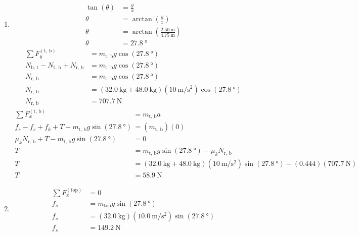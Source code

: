 \documentclass{article}
\begin{document}
\begin{enumerate}[label=\textbf{(\alph*)}]
	\item
		\begin{align*}
			\tan(\theta) & = \frac{y}{x} \\
			\theta & = \arctan \left( \frac{y}{x} \right) \\
			\theta & = \arctan \left( \frac{\SI{2.50}{\meter}}{\SI{4.75}{\meter}} \right) \\
			\theta & = \SI{27.8}{\degree}
		\end{align*}
		\begin{align*}
			\sum F_y^{(\text{t, b})} & = m_\text{t, b}g\cos(\SI{27.8}{\degree}) \\
			N_\text{b, t} - N_\text{t, b} + N_\text{r, b} & = m_\text{t, b}g\cos(\SI{27.8}{\degree}) \\
			N_\text{r, b} & = m_\text{t, b}g\cos(\SI{27.8}{\degree}) \\
			N_\text{r, b} & = (\SI{32.0}{\kilogram} + \SI{48.0}{\kilogram})(\SI{10}{\meter \per \second \squared})\cos(\SI{27.8}{\degree}) \\
			N_\text{r, b} & = \SI{707.7}{\newton}
		\end{align*}
		\begin{align*}
			\sum F_x^{(\text{t, b})} & = m_\text{t, b}a \\
			f_s - f_s + f_k + T - m_\text{t, b}g\sin(\SI{27.8}{\degree}) & = (m_\text{t, b})(0) \\
			\mu_kN_\text{r, b} + T - m_\text{t, b}g\sin(\SI{27.8}{\degree}) & = 0 \\
			T & = m_\text{t, b}g\sin(\SI{27.8}{\degree}) - \mu_kN_\text{r, b} \\
			T & = (\SI{32.0}{\kilogram} + \SI{48.0}{\kilogram})(\SI{10}{\meter \per \second \squared})\sin(\SI{27.8}{\degree}) - (0.444)(\SI{707.7}{\newton}) \\
			T & = \SI{58.9}{\newton}
		\end{align*}
	\item
		\begin{align*}
			\sum F_x^{(\text{top})} & = 0 \\
			f_s & = m_\text{top}g\sin(\SI{27.8}{\degree}) \\
			f_s & = (\SI{32.0}{\kilogram})(\SI{10.0}{\meter \per \second \squared})\sin(\SI{27.8}{\degree}) \\
			f_s & = \SI{149.2}{\newton}
		\end{align*}
\end{enumerate}
\end{document}
